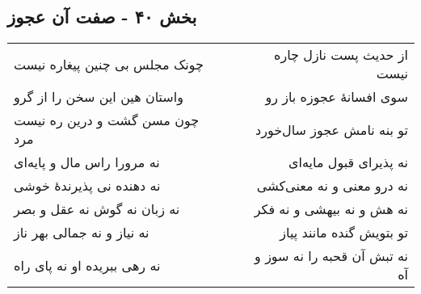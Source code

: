 \begin{center}
\section*{بخش ۴۰ - صفت آن عجوز}
\label{sec:sh040}
\begin{longtable}{l p{0.5cm} r}
چونک مجلس بی چنین پیغاره نیست
&&
از حدیث پست نازل چاره نیست
\\
واستان هین این سخن را از گرو
&&
سوی افسانهٔ عجوزه باز رو
\\
چون مسن گشت و درین ره نیست مرد
&&
تو بنه نامش عجوز سال‌خورد
\\
نه مرورا راس مال و پایه‌ای
&&
نه پذیرای قبول مایه‌ای
\\
نه دهنده نی پذیرندهٔ خوشی
&&
نه درو معنی و نه معنی‌کشی
\\
نه زبان نه گوش نه عقل و بصر
&&
نه هش و نه بیهشی و نه فکر
\\
نه نیاز و نه جمالی بهر ناز
&&
تو بتویش گنده مانند پیاز
\\
نه رهی ببریده او نه پای راه
&&
نه تبش آن قحبه را نه سوز و آه
\\
\end{longtable}
\end{center}
